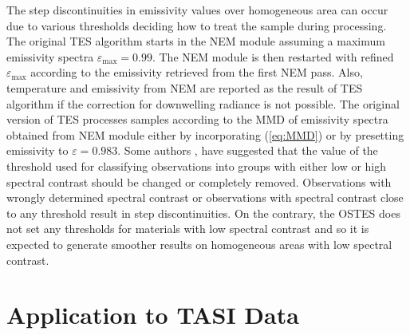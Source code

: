 The step discontinuities in emissivity values over homogeneous area can occur due to various thresholds deciding how to treat the sample during processing. The original TES algorithm starts in the NEM module assuming a maximum emissivity spectra $\varepsilon_\mathrm{max}=0.99$. The NEM module is then restarted with refined $\varepsilon_\mathrm{max}$ according to the emissivity retrieved from the first NEM pass. Also,	 temperature and emissivity from NEM are reported as the result of TES algorithm if the correction for downwelling radiance is not possible. The original version of TES processes samples according to the MMD of emissivity spectra obtained from NEM module either by incorporating (\ref{eq:MMD}) or by presetting emissivity to $\varepsilon = 0.983$. Some authors \cite{GG06}, \cite{SG09} have suggested that the value of the threshold used for classifying observations into groups with either low or high spectral contrast should be changed or completely removed. Observations with wrongly determined spectral contrast or observations with spectral contrast close to any threshold result in step discontinuities. On the contrary, the OSTES does not set any thresholds for materials with low spectral contrast and so it is expected to generate smoother results on homogeneous areas with low spectral contrast.

\section{Application to TASI Data}